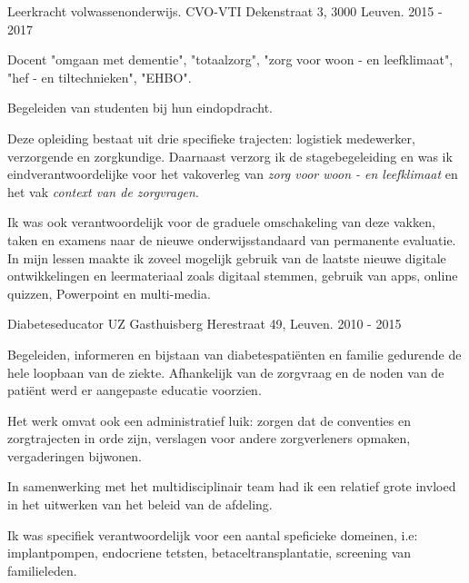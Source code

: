 \begin{cventries}
\cventry
{Leerkracht volwassenonderwijs.} %
{CVO-VTI} %
{Dekenstraat 3, 3000 Leuven.} %
{2015 - 2017} %
{ %
	\begin{cvitems}
		\item Docent "omgaan met dementie", "totaalzorg", "zorg voor woon - en leefklimaat", "hef - en tiltechnieken", "EHBO".
		\item Begeleiden van studenten bij hun eindopdracht.
		\item Deze opleiding bestaat uit  drie specifieke trajecten: logistiek medewerker, verzorgende en zorgkundige. Daarnaast verzorg ik de stagebegeleiding en was ik eindverantwoordelijke voor het vakoverleg van \textit{zorg voor woon - en leefklimaat} en het vak \textit{context van de zorgvragen}. 
		\item Ik was ook verantwoordelijk voor de graduele omschakeling van deze vakken, taken en examens naar de nieuwe onderwijsstandaard van permanente evaluatie. 
		In mijn lessen maakte ik zoveel mogelijk gebruik van de laatste nieuwe digitale ontwikkelingen en leermateriaal zoals digitaal stemmen, gebruik van apps, online quizzen, Powerpoint en multi-media.
	\end{cvitems}
}


\cventry
{Diabeteseducator} %
{UZ Gasthuisberg} %
{Herestraat 49, Leuven.} %
{2010 - 2015} %
{ %
	\begin{cvitems}
		\item Begeleiden, informeren en bijstaan van diabetespatiënten en familie gedurende de hele loopbaan van de ziekte. Afhankelijk van de zorgvraag en de noden van de pati\"{e}nt werd er aangepaste educatie voorzien.
		\item Het werk omvat ook een administratief luik: zorgen dat de conventies en zorgtrajecten in orde zijn, verslagen voor andere zorgverleners opmaken, vergaderingen bijwonen. %
		\item In samenwerking met het multidisciplinair team had ik een relatief grote invloed in het uitwerken van het beleid van de afdeling.
		\item Ik was specifiek verantwoordelijk voor een aantal speficieke domeinen, i.e: implantpompen, endocriene tetsten, betaceltransplantatie, screening van familieleden.
	\end{cvitems}
}


\end{cventries}
